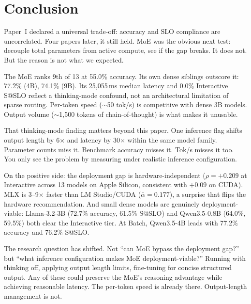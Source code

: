 \documentclass[11pt]{article}
\begin{document}
\section{Conclusion}
\label{sec:conclusion}

Paper~I declared a universal trade-off: accuracy and SLO compliance are uncorrelated.  Four papers later, it still held.  MoE was the obvious next test: decouple total parameters from active compute, see if the gap breaks.  It does not.  But the reason is not what we expected.

The MoE ranks 9th of 13 at 55.0\% accuracy.  Its own dense siblings outscore it: 77.2\% (4B), 74.1\% (9B).  Its 25,055\,ms median latency and 0.0\% Interactive S@SLO reflect a thinking-mode confound, not an architectural limitation of sparse routing.  Per-token speed (${\sim}$50 tok/s) is competitive with dense 3B models.  Output volume (${\sim}$1,500 tokens of chain-of-thought) is what makes it unusable.

That thinking-mode finding matters beyond this paper.  One inference flag shifts output length by 6$\times$ and latency by 30$\times$ within the same model family.  Parameter counts miss it.  Benchmark accuracy misses it.  Tok/s misses it too.  You only see the problem by measuring under realistic inference configuration.

On the positive side: the deployment gap is hardware-independent ($\rho = +0.209$ at Interactive across 13 models on Apple Silicon, consistent with $+0.09$ on CUDA).  MLX is 3--9$\times$ faster than LM Studio/CUDA ($\bar{\alpha} = 0.177$), a surprise that flips the hardware recommendation.  And small dense models are genuinely deployment-viable: Llama-3.2-3B (72.7\% accuracy, 61.5\% S@SLO) and Qwen3.5-0.8B (64.0\%, 59.5\%) both clear the Interactive tier.  At Batch, Qwen3.5-4B leads with 77.2\% accuracy and 76.2\% S@SLO.

The research question has shifted.  Not ``can MoE bypass the deployment gap?'' but ``what inference configuration makes MoE deployment-viable?'' Running with thinking off, applying output length limits, fine-tuning for concise structured output.  Any of these could preserve the MoE's reasoning advantage while achieving reasonable latency.  The per-token speed is already there.  Output-length management is not.
\end{document}
